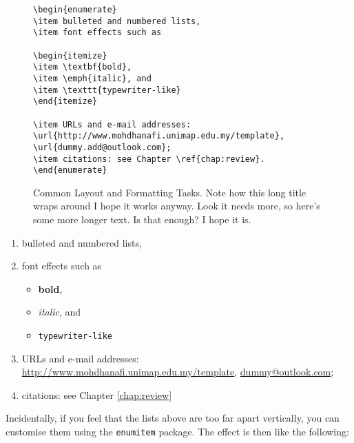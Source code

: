 
\begin{figure}[htb!]
\begin{lstlisting}
\begin{enumerate}
\item bulleted and numbered lists, 
\item font effects such as

\begin{itemize}
\item \textbf{bold}, 
\item \emph{italic}, and 
\item \texttt{typewriter-like}
\end{itemize}

\item URLs and e-mail addresses: \url{http://www.mohdhanafi.unimap.edu.my/template}, \url{dummy.add@outlook.com};
\item citations: see Chapter \ref{chap:review}.
\end{enumerate}
\end{lstlisting}
\caption{Common Layout and Formatting Tasks. Note how this long title wraps around I hope it works anyway. Look it needs more, so here's some more longer text. Is that enough? I hope it is.}\label{fig:simple}
\end{figure}

\begin{enumerate}
\item bulleted and numbered lists, 
\item font effects such as

\begin{itemize}
\item \textbf{bold}, 
\item \emph{italic}, and 
\item \texttt{typewriter-like}
\end{itemize}

\item URLs and e-mail addresses:\\ \url{http://www.mohdhanafi.unimap.edu.my/template}, \url{dummy@outlook.com};
\item citations: see Chapter \ref{chap:review}
\end{enumerate}

Incidentally, if you feel that the lists above are too far apart vertically, you can customise them using the \texttt{enumitem} package. The effect is then like the following:

